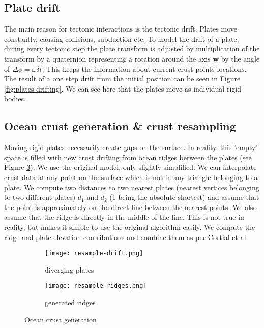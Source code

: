 \subsection{Plate drift}
The main reason for tectonic interactions is the tectonic drift. Plates move constantly, causing collisions, subduction etc. To model the drift of a plate, during every tectonic step the plate transform is adjusted
by multiplication of the transform by a quaternion representing a rotation around the axis $\mathbf{w}$ by the angle of $\Delta\phi=\omega\delta t$. This keeps the information about current crust points locations. The result of a one step drift from the initial position can be seen in Figure \ref{fig:plates-drifting}. We can see here that the plates move as individual rigid bodies.
\subsection{Ocean crust generation \& crust resampling}
Moving rigid plates necessarily create gaps on the surface. In reality, this 'empty' space is filled with new crust drifting from ocean ridges between the plates (see Figure \ref{fig:resample-mesh}). We use the original model, only slightly simplified. We can interpolate crust data at any point on the surface which is not in any triangle belonging to a plate. We compute two distances to two nearest plates (nearest vertices belonging to two different plates) $d_1$ and $d_2$ (1 being the absolute shortest) and assume that the point is approximately on the direct line between the nearest points. We also assume that the ridge is directly in the middle of the line. This is not true in reality, but makes it simple to use the original algorithm easily. We compute the ridge and plate elevation contributions and combine them as per Cortial et al.
\begin{figure}[ht]
\centering
\begin{subfigure}{7cm}
\texttt{[image: resample-drift.png]}
\caption{diverging plates}
\label{fig:resample-drift}
\end{subfigure}
\hspace*{1cm}
\begin{subfigure}{7cm}
\texttt{[image: resample-ridges.png]}
\caption{generated ridges}
\label{fig:resample-ridges}
\end{subfigure}
\caption{Ocean crust generation}
\label{fig:resample-mesh}
\end{figure}

